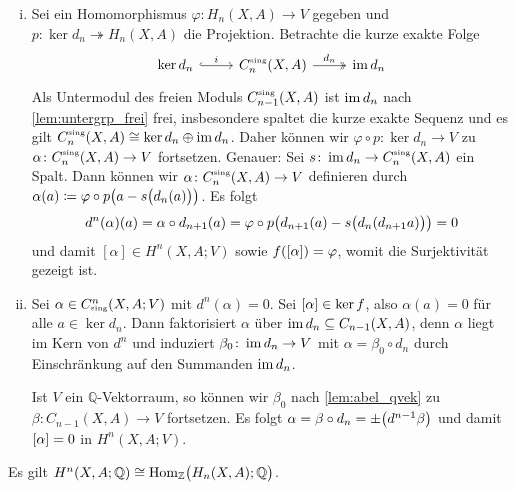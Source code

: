 \begin{beweis}[name={von \autoref{eig_kohomo_to_hom_homo}}] \leavevmode
	\begin{enumerate}[(i)]
		\item Sei ein Homomorphismus $\varphi \colon H_n(X,A) \to V$ gegeben und $p \colon\ker d_n \twoheadrightarrow H_n(X,A)$ die Projektion. 
		Betrachte die kurze exakte Folge 
		\[
			\begin{tikzcd}
				\ker  d_n \rar[hook,"i"] & C_n^\sing(X,A) \rar["d_n",two heads] & \im d_n
			\end{tikzcd}
		\]
		Als Untermodul des freien Moduls $C_{n-1}^\sing(X,A)$ ist $\im d_n$ nach \autoref{lem:untergrp_frei} frei, insbesondere spaltet die kurze exakte Sequenz und es gilt $C^\sing_n(X,A) \cong \ker d_n \oplus \im d_n$. 
		Daher können wir $\varphi \circ p \colon \ker d_n \to V$ zu $\alpha \colon C_n^\sing(X,A) \to V$ fortsetzen. 
		Genauer: Sei $s \colon \im d_n \to C_n^\sing(X,A)$ ein Spalt. 
		Dann können wir $\alpha \colon C_n^\sing(X,A) \to V$ definieren durch 
		\(
			\alpha(a) \coloneqq \varphi \circ p \enbrace*{a - s \enbrace[\big]{d_n(a)}}
		\).
		Es folgt
		\[
			d^n (\alpha)(a)= \alpha \circ d_{n+1}(a)= \varphi \circ p \enbrace*{d_{n+1}(a) -  s \enbrace[\big]{d_n (d_{n+1}a)}} =0
		\] 
		und damit $[\alpha] \in H^n(X,A;V)$ sowie $f \enbrace*{[\alpha]}=\varphi$, womit die Surjektivität gezeigt ist.
		\item Sei $\alpha \in C^n_\sing(X,A;V)$ mit $d^n(\alpha)=0$. Sei $\benbrace*{\alpha}\in\ker f$, also $\alpha(a)=0$ für alle $a \in \ker d_n$. Dann faktorisiert $\alpha$ über
		$\im d_n \subseteq C_{n-1}(X,A)$, denn $\alpha$ liegt im Kern von $d^n$ und induziert $\beta_0 \colon \im d_n \to V$ mit $\alpha = \beta_0 \circ d_n$ durch Einschränkung 
		auf den Summanden $\im d_n$. 
	
		Ist $V$ ein $\mathbb{Q}$-Vektorraum, so können wir $\beta_0$ nach \autoref{lem:abel_qvek} zu $\beta \colon C_{n-1}(X,A) \to V$ fortsetzen. Es folgt 
		$\alpha= \beta \circ d_n = \pm \enbrace*{d^{n-1} \beta}$ und damit $\benbrace*{\alpha}=0$ in $H^n(X,A;V)$. \qedhere
	\end{enumerate}
\end{beweis}

\begin{korollarB}[{name=[{Kohomologie mit rationalen Vektorräumen}]},label=kor:26]
	Es gilt $H^n(X,A;\mathbb{Q}) \cong \Hom_{\mathbb{Z}}\enbrace[\big]{H_n(X,A);\mathbb{Q}}$.
\end{korollarB}

